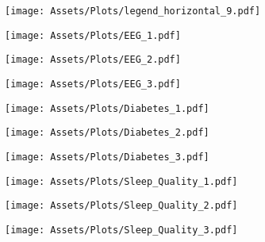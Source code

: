 \documentclass[letterpaper]{article}
\begin{document}
\begin{figure}[!t]
    \centering

    \begin{subfigure}[b]{1\textwidth}
        \texttt{[image: Assets/Plots/legend\_horizontal\_9.pdf]}
       
        \label{fig:horizontal}
    \end{subfigure}

    
    
    \begin{subfigure}[b]{0.31\columnwidth}
        \texttt{[image: Assets/Plots/EEG\_1.pdf]}
        \label{fig:EEG_Bach_1}
    \end{subfigure}
    \hfill
    \begin{subfigure}[b]{0.31\columnwidth}
        \texttt{[image: Assets/Plots/EEG\_2.pdf]}
        \label{fig:EEG_Bach_2}
    \end{subfigure}
    \hfill
    \begin{subfigure}[b]{0.31\columnwidth}
        \texttt{[image: Assets/Plots/EEG\_3.pdf]}
        \label{fig:EEG_Bach_3}
    \end{subfigure}
    \vspace{-10pt}
    
    \begin{subfigure}[b]{0.31\columnwidth}
        \texttt{[image: Assets/Plots/Diabetes\_1.pdf]}
        \label{fig:Diabetes_Bach_1}
    \end{subfigure}
    \hfill
    \begin{subfigure}[b]{0.31\columnwidth}
        \texttt{[image: Assets/Plots/Diabetes\_2.pdf]}
        \label{fig:Diabetes_Bach_2}
    \end{subfigure}
    \hfill
    \begin{subfigure}[b]{0.31\columnwidth}
        \texttt{[image: Assets/Plots/Diabetes\_3.pdf]}
        \label{fig:Diabetes_Bach_3}
    \end{subfigure}
    \vspace{-10pt}
    
    \begin{subfigure}[b]{0.31\columnwidth}
        \texttt{[image: Assets/Plots/Sleep\_Quality\_1.pdf]}
        \label{fig:Sleep Quality_1}
    \end{subfigure}
    \hfill
    \begin{subfigure}[b]{0.31\columnwidth}
        \texttt{[image: Assets/Plots/Sleep\_Quality\_2.pdf]}
        \label{fig:Sleep Quality_Bach_2}
    \end{subfigure}
    \hfill
    \begin{subfigure}[b]{0.31\columnwidth}
        \texttt{[image: Assets/Plots/Sleep\_Quality\_3.pdf]}
        \label{fig:Sleep Quality_Bach_3}
    \end{subfigure}
 \vspace{-20pt}
    

\end{figure}
\end{document}

